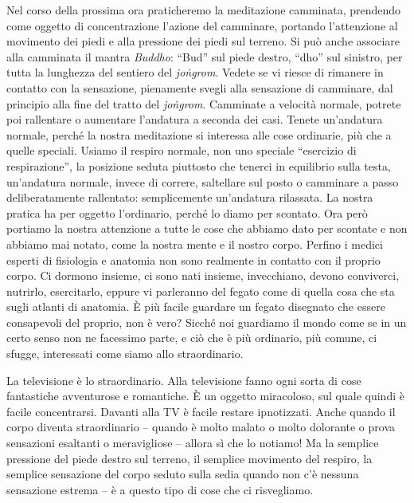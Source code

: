 
Nel corso della prossima ora praticheremo la meditazione camminata,
prendendo come oggetto di concentrazione l'azione del camminare,
portando l'attenzione al movimento dei piedi e alla pressione dei piedi
sul terreno. Si può anche associare alla camminata il mantra \textit{Buddho}:
``Bud'' sul piede destro, ``dho'' sul sinistro, per tutta la lunghezza del
sentiero del \textit{joṅgrom}. Vedete se vi riesce di rimanere in contatto con la
sensazione, pienamente svegli alla sensazione di camminare, dal
principio alla fine del tratto del \textit{joṅgrom}. Camminate a velocità
normale, potrete poi rallentare o aumentare l'andatura a seconda dei
casi. Tenete un'andatura normale, perché la nostra meditazione si
interessa alle cose ordinarie, più che a quelle speciali. Usiamo il
respiro normale, non uno speciale ``esercizio di respirazione'', la
posizione seduta piuttosto che tenerci in equilibrio sulla testa,
un'andatura normale, invece di correre, saltellare sul posto o camminare
a passo deliberatamente rallentato: semplicemente un'andatura rilassata.
La nostra pratica ha per oggetto l'ordinario, perché lo diamo per
scontato. Ora però portiamo la nostra attenzione a tutte le cose che
abbiamo dato per scontate e non abbiamo mai notato, come la nostra mente
e il nostro corpo. Perfino i medici esperti di fisiologia e anatomia non
sono realmente in contatto con il proprio corpo. Ci dormono insieme, ci
sono nati insieme, invecchiano, devono conviverci, nutrirlo,
esercitarlo, eppure vi parleranno del fegato come di quella cosa che sta
sugli atlanti di anatomia. È più facile guardare un fegato disegnato
che essere consapevoli del proprio, non è vero? Sicché noi guardiamo il
mondo come se in un certo senso non ne facessimo parte, e ciò che è più
ordinario, più comune, ci sfugge, interessati come siamo allo
straordinario.

La televisione è lo straordinario. Alla televisione fanno ogni sorta di
cose fantastiche avventurose e romantiche. È un oggetto miracoloso, sul
quale quindi è facile concentrarsi. Davanti alla TV è facile restare
ipnotizzati. Anche quando il corpo diventa straordinario – quando è
molto malato o molto dolorante o prova sensazioni esaltanti o
meravigliose – allora sì che lo notiamo! Ma la semplice pressione del
piede destro sul terreno, il semplice movimento del respiro, la semplice
sensazione del corpo seduto sulla sedia quando non c'è nessuna
sensazione estrema – è a questo tipo di cose che ci risvegliamo.

\pagebreak

